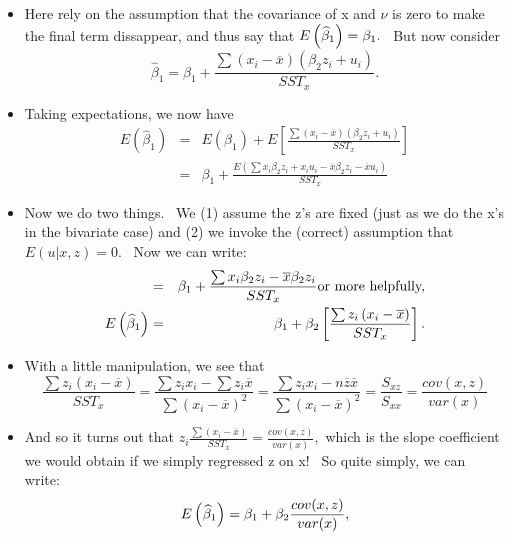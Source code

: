 \documentclass[11pt]{article}
\begin{document}
\begin{itemize}
\item Here rely on the assumption that the covariance of x and $\nu $ is
zero to make the final term dissappear, and thus say that $E\left( \widehat{%
\beta }_{1}\right) =\beta _{1}.$ \ But now consider%
\begin{equation*}
\widehat{\beta }_{1}=\beta _{1}+\frac{\sum \left( x_{i}-\overline{x}\right)
\left( \beta _{2}z_{i}+u_{i}\right) }{SST_{x}}.
\end{equation*}

\item Taking expectations, we now have%
\begin{eqnarray*}
E\left( \widehat{\beta }_{1}\right) &=&E\left( \beta _{1}\right) +E\left[ 
\frac{\sum \left( x_{i}-\overline{x}\right) \left( \beta
_{2}z_{i}+u_{i}\right) }{SST_{x}}\right] \\
&=&\beta _{1}+\frac{E\left( \sum x_{i}\beta _{2}z_{i}+x_{i}u_{i}-\overline{x}%
\beta _{2}z_{i}-\overline{x}u_{i}\right) }{SST_{x}}
\end{eqnarray*}

\item Now we do two things. \ We (1) assume the z's are fixed (just as we do
the x's in the bivariate case) and (2) we invoke the (correct) assumption
that $E\left( u|x,z\right) =0$. \ Now we can write:%
\begin{eqnarray*}
&=&\beta _{1}+\frac{\sum x_{i}\beta _{2}z_{i}-\overline{x}\beta _{2}z_{i}}{%
SST_{x}}\text{or more helpfully,} \\
E\left( \widehat{\beta }_{1}\right) &=&\beta _{1}+\beta _{2}\left[ \frac{%
\sum z_{i}\left( x_{i}-\overline{x}\right) }{SST_{x}}\right] .
\end{eqnarray*}

\item With a little manipulation, we see that 
\begin{equation*}
\frac{\sum z_{i}\left( x_{i}-\overline{x}\right) }{SST_{x}}=\frac{\sum
z_{i}x_{i}-\sum z_{i}\overline{x}}{\sum \left( x_{i}-\overline{x}\right) ^{2}%
}=\frac{\sum z_{i}x_{i}-n\overline{z}\overline{x}}{\sum \left( x_{i}-%
\overline{x}\right) ^{2}}=\frac{S_{xz}}{S_{xx}}=\frac{cov(x,z)}{var(x)}
\end{equation*}

\item And so it turns out that $z_{i}\frac{\sum \left( x_{i}-\overline{x}%
\right) }{SST_{x}}=\frac{cov(x,z)}{var(x)},$ which is the slope coefficient
we would obtain if we simply regressed z on x! \ So quite simply, we can
write:%
\begin{equation*}
E\left( \widehat{\beta }_{1}\right) =\beta _{1}+\beta _{2}\frac{cov(x,z)}{%
var(x)},
\end{equation*}


\end{itemize}
\end{document}
